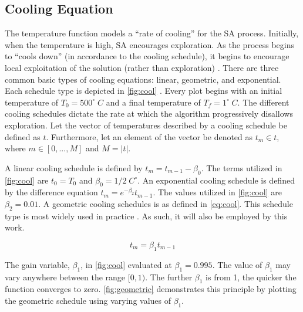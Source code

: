 \documentclass[11pt,a4paper,final]{article}
\newcommand{\Tau}{T}                        %
\begin{document}
\subsection{Cooling Equation}
\label{cooling-equation-experimental}
The temperature function models a ``rate of cooling'' for the SA process. Initially, when the temperature is high, SA
encourages exploration. As the process begins to ``cools down'' (in accordance to the cooling schedule), it begins to
encourage local exploitation of the solution (rather than exploration)
\cite{rutenbar-1989-simul-anneal-algor,henderson-1989-theor-pract}. There are three common basic types of cooling
equations: linear, geometric, and exponential. Each schedule type is depicted in \ref{fig:cool}
\cite{keller-2019-multi-objec}. Every plot begins with an initial temperature of \(T_0 = 500^\circ\; C\) and a final
temperature of \(T_f = 1^\circ\; C\). The different cooling schedules dictate the rate at which the algorithm progressively
disallows exploration. Let the vector of temperatures described by a cooling schedule be defined as \(t\). Furthermore,
let an element of the vector be denoted as \(t_m \in t\), where \(m \in [0,...,M]\) and \(M = \lvert t \rvert\).

A linear cooling schedule is defined by \(t_m = t_{m-1} - \beta_0\). The terms utilized in \ref{fig:cool} are \(t_0 = \Tau_0\)
and \(\beta_0 = 1/2\; C^\circ\). An exponential cooling schedule is defined by the difference equation \(t_m = e^{-\beta_2}t_{m-1}\).
The values utilized in \ref{fig:cool} are \(\beta_2 = 0.01\). A geometric cooling schedules is as defined in \ref{eq:cool}. This
schedule type is most widely used in practice \cite{keller-2019-multi-objec}. As such, it will also be employed by this
work.

\begin{equation}
\label{eq:cool}
t_m = \beta_1 t_{m-1}
\end{equation}

The gain variable, \(\beta_1\), in \ref{fig:cool} evaluated at \(\beta_1 = 0.995\). The value of \(\beta_1\) may vary anywhere between the
range \([0,1)\). The further \(\beta_1\) is from 1, the quicker the function converges to zero. \ref{fig:geometric} demonstrates
this principle by plotting the geometric schedule using varying values of \(\beta_1\).
\end{document}
